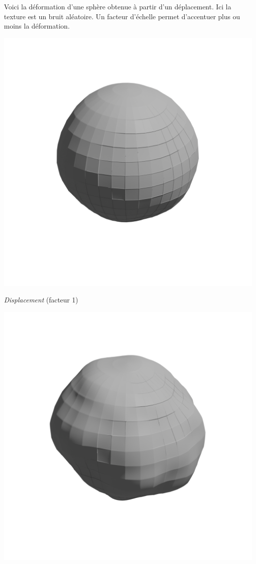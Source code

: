 \documentclass[11pt,class=report,crop=false]{standalone}
\begin{document}
Voici la déformation d'une sphère obtenue à partir d'un déplacement. Ici la texture est un bruit aléatoire. Un facteur d'échelle permet d'accentuer plus ou moins la déformation. 
\begin{center}	
	\begin{minipage}{0.32\textwidth}
		\center
		\includegraphics[scale=\myscale,scale=0.13,trim={0 8cm 0 6cm},clip]{figures/texture-sphere-dis1}
		
		\emph{Displacement} (facteur 1)
	\end{minipage}	
	\qquad\qquad
	\begin{minipage}{0.32\textwidth}
		\center
		\includegraphics[scale=\myscale,scale=0.13,trim={0 8cm 0 6cm},clip]{figures/texture-sphere-dis2}
		

\end{minipage}
\end{center}
\end{document}
